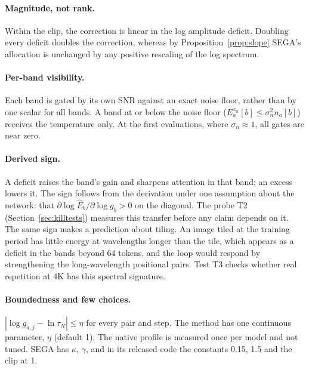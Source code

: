 \paragraph{Magnitude, not rank.}
Within the clip, the correction is linear in the log amplitude deficit. Doubling every deficit doubles the correction, whereas by Proposition~\ref{prop:slope} SEGA's allocation is unchanged by any positive rescaling of the log spectrum.

\paragraph{Per-band visibility.}
Each band is gated by its own SNR against an exact noise floor, rather than by one scalar for all bands. A band at or below the noise floor ($E^{x_n}_a[b]\le\sigma_n^2n_a[b]$) receives the temperature only. At the first evaluations, where $\sigma_n\approx1$, all gates are near zero.

\paragraph{Derived sign.}
A deficit raises the band's gain and sharpens attention in that band; an excess lowers it. The sign follows from the derivation under one assumption about the network: that $\partial\log\hat E_b/\partial\log g_b>0$ on the diagonal. The probe T2 (Section~\ref{sec:killtests}) measures this transfer before any claim depends on it. The same sign makes a prediction about tiling. An image tiled at the training period has little energy at wavelengths longer than the tile, which appears as a deficit in the bands beyond 64 tokens, and the loop would respond by strengthening the long-wavelength positional pairs. Test T3 checks whether real repetition at 4K has this spectral signature.

\paragraph{Boundedness and few choices.}
$|\log g_{a,j}-\ln\tau_N|\le\eta$ for every pair and step. The method has one continuous parameter, $\eta$ (default 1). The native profile is measured once per model and not tuned. SEGA has $\kappa$, $\gamma$, and in its released code the constants 0.15, 1.5 and the clip at 1.

